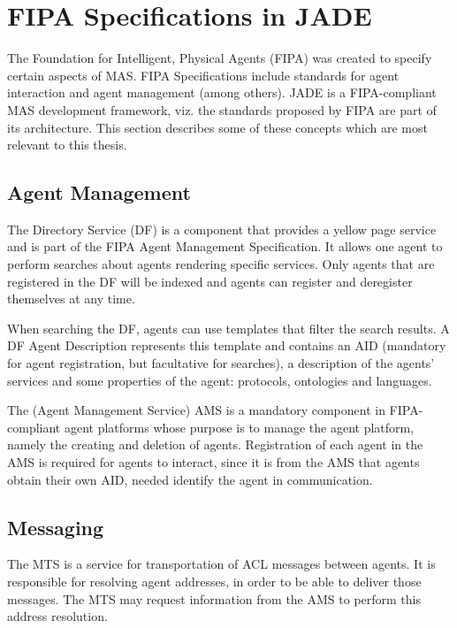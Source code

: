 \section{FIPA Specifications in JADE} %
\label{sec:fipa}

The Foundation for Intelligent, Physical Agents (FIPA) was created to specify certain aspects of MAS\cite{bellifemine2007developing}. FIPA Specifications include standards for agent interaction and agent management (among others). JADE is a FIPA-compliant MAS development framework, viz. the standards proposed by FIPA are part of its architecture. This section describes some of these concepts which are most relevant to this thesis.


\subsection{Agent Management}
The Directory Service (DF) is a component that provides a yellow page service and is part of the FIPA Agent Management Specification. It allows one agent to perform searches about agents rendering specific services. Only agents that are registered in the DF will be indexed and agents can register and deregister themselves at any time.

When searching the DF, agents can use templates that filter the search results. A DF Agent Description represents this template and contains an AID (mandatory for agent registration, but facultative for searches), a description of the agents' services and some properties of the agent: protocols, ontologies and languages.

The (Agent Management Service) AMS is a mandatory component in FIPA-compliant agent platforms whose purpose is to manage the agent platform, namely the creating and deletion of agents. Registration of each agent in the AMS is required for agents to interact, since it is from the AMS that agents obtain their own AID, needed identify the agent in communication.

\subsection{Messaging}

The MTS is a service for transportation of ACL messages between agents. It is responsible for resolving agent addresses, in order to be able to deliver those messages. The MTS may request information from the AMS to perform this address resolution.


